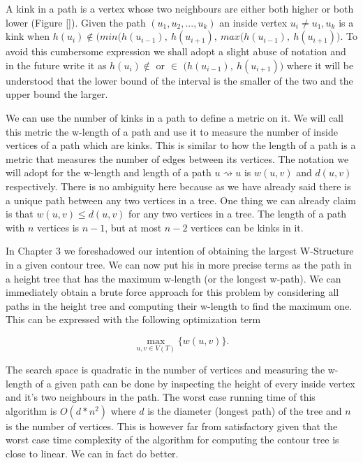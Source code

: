 

A kink in a path is a vertex whose two neighbours are either both higher or both lower (Figure []). Given the path $(u_1, u_2, ... , u_k)$ an inside vertex $u_i \ne u_1, u_k$ is a kink when $h(u_i) \notin \big( min(h(u_{i-1}),~h(u_{i+1}),~max(h(u_{i-1}),~h(u_{i+1}) \big)$. To avoid this cumbersome expression we shall adopt a slight abuse of notation and in the future write it as $h(u_i) \notin $ or $ \in $ $\big(h(u_{i-1}),~h(u_{i+1}) \big)$ where it will be understood that the lower bound of the interval is the smaller of the two and the upper bound the larger.


We can use the number of kinks in a path to define a metric on it. We will call this metric the w-length of a path and use it to measure the number of inside vertices of a path which are kinks. This is similar to how the length of a path is a metric that measures the number of edges between its vertices. The notation we will adopt for the w-length and length of a path $u \rightsquigarrow u$ is $w(u, v)$ and $d(u, v)$ respectively. There is no ambiguity here because as we have already said there is a unique path between any two vertices in a tree. One thing we can already claim is that $w(u, v) \le d(u, v)$ for any two vertices in a tree. The length of a path with $n$ vertices is $n-1$, but at most $n-2$ vertices can be kinks in it.

In Chapter 3 we foreshadowed our intention of obtaining the largest W-Structure in a given contour tree. We can now put his in more precise terms as the path in a height tree that has the maximum w-length (or the longest w-path). We can immediately obtain a brute force approach for this problem by considering all paths in the height tree and computing their w-length to find the maximum one. This can be expressed with the following optimization term

$$ \max_{u, v \in V(T)}\{ w(u, v) \} .$$

The search space is quadratic in the number of vertices and measuring the w-length of a given path can be done by inspecting the height of every inside vertex and it's two neighbours in the path. The worst case running time of this algorithm is $O(d*n^2)$ where $d$ is the diameter (longest path) of the tree and $n$ is the number of vertices. This is however far from satisfactory given that the worst case time complexity of the algorithm for computing the contour tree is close to linear. We can in fact do better.

